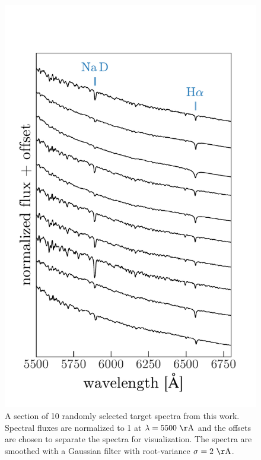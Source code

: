 \documentclass[modern, letterpaper]{aastex61}
\begin{document}
\begin{figure}[htbp]
  \begin{center}
    \includegraphics[width=0.6\linewidth]{sample_spectra.pdf}
  \end{center}
  \caption{%
    A section of 10 randomly selected target spectra from this work.
    Spectral fluxes are normalized to 1 at $\lambda = 5500~{\rm \AA}$ and the
    offsets are chosen to separate the spectra for visualization.
    The spectra are smoothed with a Gaussian filter with root-variance $\sigma
    = 2~{\rm \AA}$.
    \label{fig:sample-spectra}}
\end{figure}
\end{document}
